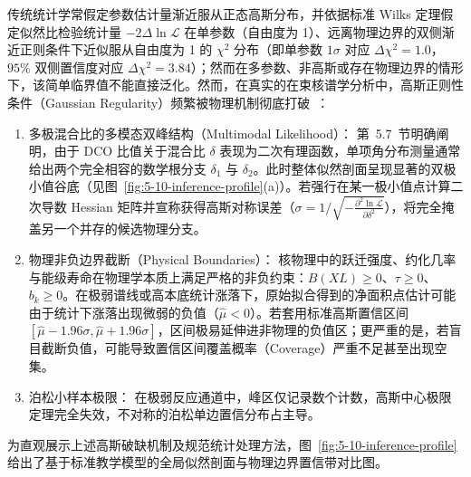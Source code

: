 传统统计学常假定参数估计量渐近服从正态高斯分布，并依据标准 Wilks 定理假定似然比检验统计量 $-2\Delta\ln\mathcal{L}$ 在单参数（自由度为 1）、远离物理边界的双侧渐近正则条件下近似服从自由度为 1 的 $\chi^2$ 分布（即单参数 $1\sigma$ 对应 $\Delta\chi^2 = 1.0$，$95\%$ 双侧置信度对应 $\Delta\chi^2 = 3.84$）；然而在多参数、非高斯或存在物理边界的情形下，该简单临界值不能直接泛化。然而，在真实的在束核谱学分析中，高斯正则性条件（Gaussian Regularity）频繁被物理机制彻底打破~\cite{book-zhu-experimental-statistics, book-behnke-data-analysis, book-bonamente-statistics}：
\begin{enumerate}
\item 多极混合比的多模态双峰结构（Multimodal Likelihood）：
第~5.7~节明确阐明，由于 DCO 比值关于混合比 $\delta$ 表现为二次有理函数，单项角分布测量通常给出两个完全相容的数学根分支 $\delta_1$ 与 $\delta_2$。此时整体似然剖面呈现显著的双极小值谷底（见图~\ref{fig:5-10-inference-profile}(a)）。若强行在某一极小值点计算二次导数 Hessian 矩阵并宣称获得高斯对称误差（$\sigma = 1/\sqrt{-\frac{\partial^2\ln\mathcal{L}}{\partial\delta^2}}$），将完全掩盖另一个并存的候选物理分支。
\item 物理非负边界截断（Physical Boundaries）：
核物理中的跃迁强度、约化几率与能级寿命在物理学本质上满足严格的非负约束：$B(XL) \ge 0$、$\tau \ge 0$、$b_k \ge 0$。在极弱谱线或高本底统计涨落下，原始拟合得到的净面积点估计可能由于统计下涨落出现微弱的负值（$\widehat{\mu} < 0$）。若套用标准高斯置信区间 $[\widehat{\mu} - 1.96\sigma, \widehat{\mu} + 1.96\sigma]$，区间极易延伸进非物理的负值区；更严重的是，若盲目截断负值，可能导致置信区间覆盖概率（Coverage）严重不足甚至出现空集。
\item 泊松小样本极限：
在极弱反应通道中，峰区仅记录数个计数，高斯中心极限定理完全失效，不对称的泊松单边置信分布占主导。
\end{enumerate}

为直观展示上述高斯破缺机制及规范统计处理方法，图~\ref{fig:5-10-inference-profile} 给出了基于标准教学模型的全局似然剖面与物理边界置信带对比图。

